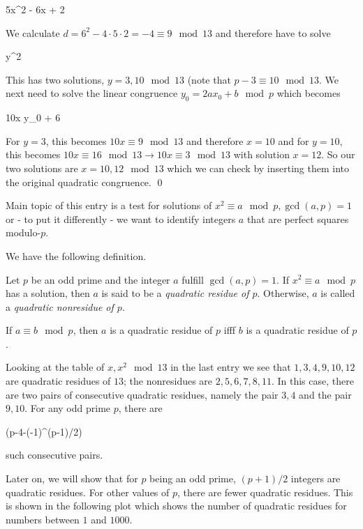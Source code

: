 \bee
5x^2 - 6x + 2  
\eee

We calculate $d = 6^2 - 4\cdot 5 \cdot 2 = -4 \equiv 9 \mod 13$ and therefore have to solve

\bee
y^2  
\eee

This has two solutions, $y = 3, 10 \mod 13$ (note that $p-3 \equiv 10 \mod 13$. We next need to solve the linear congruence $y_0 = 2ax_0 + b \mod p$ which becomes

\bee
10x \equiv y_0 + 6 
\eee

For $y = 3$, this becomes $10 x \equiv 9 \mod 13$ and therefore $x = 10$ and for $y = 10$, this becomes $10x \equiv 16 \mod 13 \rightarrow 10x \equiv 3 \mod 13$ with solution $x = 12$. So our two solutions are $x = 10, 12 \mod 13$ which we can check by inserting them into the original quadratic congruence. \qed

Main topic of this entry is a test for solutions of $x^2 \equiv a \mod p, \gcd(a,p)=1$ or - to put it differently - we want to identify integers $a$ that are perfect squares modulo-$p$.

We have the following definition.

\begin{definition}
	Let $p$ be an odd prime and the integer $a$ fulfill $\gcd(a,p) = 1$. If $x^2 \equiv a \mod p$ has a solution, then $a$ is said to be a \emph{quadratic residue of $p$}. Otherwise, $a$ is called a \emph{quadratic nonresidue of $p$}.
\end{definition}

If $a \equiv b \mod p$, then $a$ is a quadratic residue of $p$ ifff $b$ is a quadratic residue of $p$.

Looking at the table of $x, x^2 \mod 13$ in the last entry we see that $1, 3, 4, 9, 10, 12$ are quadratic residues of $13$; the nonresidues are $2,5,6,7,8,11$. In this case, there are two pairs of consecutive quadratic residues, namely the pair $3,4$ and the pair $9,10$. For any odd prime $p$, there are 

\bee
{}(p-4-(-1)^{(p-1)/2})
\eee

such consecutive pairs.

Later on, we will show that for $p$ being an odd prime, $(p+1)/2$ integers are quadratic residues. For other values of $p$, there are fewer quadratic residues. This is shown in the following plot which shows the number of quadratic residues for numbers between $1$ and $1000$.


